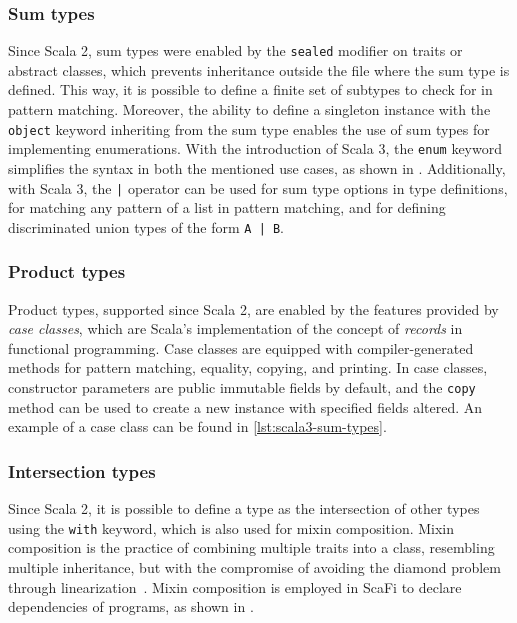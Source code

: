 \subsubsection{Sum types}

Since Scala 2, sum types were enabled by the \texttt{sealed} modifier on traits or abstract classes, which prevents inheritance outside the file where the sum type is defined.
%
This way, it is possible to define a finite set of subtypes to check for in pattern matching.
%
Moreover, the ability to define a singleton instance with the \texttt{object} keyword inheriting from the sum type enables the use of sum types for implementing enumerations.
%
With the introduction of Scala 3, the \texttt{enum} keyword simplifies the syntax in both the mentioned use cases, as shown in .
%
Additionally, with Scala 3, the \texttt{|} operator can be used for sum type options in type definitions, for matching any pattern of a list in pattern matching, and for defining discriminated union types of the form \texttt{A | B}.



\subsubsection{Product types}

Product types, supported since Scala 2, are enabled by the features provided by \textit{case classes}, which are Scala's implementation of the concept of \textit{records} in functional programming.
%
Case classes are equipped with compiler-generated methods for pattern matching, equality, copying, and printing.
%
In case classes, constructor parameters are public immutable fields by default, and the \texttt{copy} method can be used to create a new instance with specified fields altered.
%
An example of a case class can be found in \cref{lst:scala3-sum-types}.

\subsubsection{Intersection types}

Since Scala 2, it is possible to define a type as the intersection of other types using the \texttt{with} keyword, which is also used for mixin composition.
%
Mixin composition is the practice of combining multiple traits into a class, resembling multiple inheritance, but with the compromise of avoiding the diamond problem through linearization~\cite{scala-patterns}.
%
Mixin composition is employed in ScaFi to declare dependencies of programs, as shown in .

